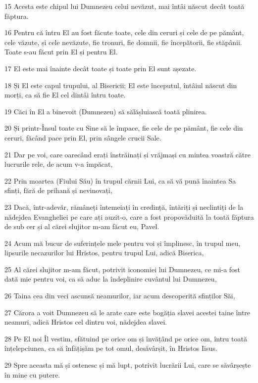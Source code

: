 \par 15 Acesta este chipul lui Dumnezeu celui nevăzut, mai întâi născut decât toată făptura.
\par 16 Pentru că întru El au fost făcute toate, cele din ceruri și cele de pe pământ, cele văzute, și cele nevăzute, fie tronuri, fie domnii, fie începătorii, fie stăpânii. Toate s-au făcut prin El și pentru El.
\par 17 El este mai înainte decât toate și toate prin El sunt așezate.
\par 18 Și El este capul trupului, al Bisericii; El este începutul, întâiul născut din morți, ca să fie El cel dintâi întru toate.
\par 19 Căci în El a binevoit (Dumnezeu) să sălășluiască toată plinirea.
\par 20 Și printr-Însul toate cu Sine să le împace, fie cele de pe pământ, fie cele din ceruri, făcând pace prin El, prin sângele crucii Sale.
\par 21 Dar pe voi, care oarecând erați înstrăinați și vrăjmași cu mintea voastră către lucrurile rele, de acum v-a împăcat,
\par 22 Prin moartea (Fiului Său) în trupul cărnii Lui, ca să vă pună înaintea Sa sfinți, fără de prihană și nevinovați,
\par 23 Dacă, într-adevăr, rămâneți întemeiați în credință, întăriți și neclintiți de la nădejdea Evangheliei pe care ați auzit-o, care a fost propovăduită la toată făptura de sub cer și al cărei slujitor m-am făcut eu, Pavel.
\par 24 Acum mă bucur de suferințele mele pentru voi și împlinesc, în trupul meu, lipsurile necazurilor lui Hristos, pentru trupul Lui, adică Biserica,
\par 25 Al cărei slujitor m-am făcut, potrivit iconomiei lui Dumnezeu, ce mi-a fost dată mie pentru voi, ca să aduc la îndeplinire cuvântul lui Dumnezeu,
\par 26 Taina cea din veci ascunsă neamurilor, iar acum descoperită sfinților Săi,
\par 27 Cărora a voit Dumnezeu să le arate care este bogăția slavei acestei taine între neamuri, adică Hristos cel dintru voi, nădejdea slavei.
\par 28 Pe El noi Îl vestim, sfătuind pe orice om și învățând pe orice om, întru toată înțelepciunea, ca să înfățișăm pe tot omul, desăvârșit, în Hristos Iisus.
\par 29 Spre aceasta mă și ostenesc și mă lupt, potrivit lucrării Lui, care se săvârșește în mine cu putere.

